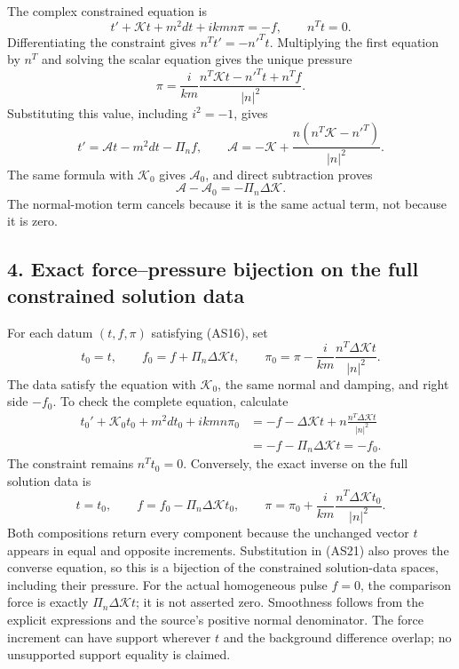 \documentclass[10pt,a4paper]{article}
\begin{document}
The complex constrained equation is \[
t'+\mathcal Kt+m^2dt+ikm n\pi=-f,
\qquad n^Tt=0.
\tag{AS16}
\] Differentiating the constraint gives \(n^Tt'=-n'^Tt\). Multiplying the first equation by \(n^T\) and solving the scalar equation gives the unique pressure \[
\pi=\frac{i}{km}\frac{n^T\mathcal Kt-n'^Tt+n^Tf}{|n|^2}.
\tag{AS17}
\] Substituting this value, including \(i^2=-1\), gives \[
t'=\mathcal A t-m^2dt-\Pi_nf,
\qquad
\mathcal A=-\mathcal K+
\frac{n(n^T\mathcal K-n'^T)}{|n|^2}.
\tag{AS18}
\] The same formula with \(\mathcal K_0\) gives \(\mathcal A_0\), and direct subtraction proves \[
\mathcal A-\mathcal A_0=-\Pi_n\Delta\mathcal K.
\tag{AS19}
\] The normal-motion term cancels because it is the same actual term, not because it is zero.

\subsection{4. Exact force--pressure bijection on the full constrained solution data}\label{gclosure:exact-forcepressure-bijection-on-the-full-constrained-solution-data}

For each datum \((t,f,\pi)\) satisfying (AS16), set \[
t_0=t,\qquad f_0=f+\Pi_n\Delta\mathcal Kt,
\qquad \pi_0=\pi-\frac{i}{km}\frac{n^T\Delta\mathcal Kt}{|n|^2}.
\tag{AS20}
\] The data satisfy the equation with \(\mathcal K_0\), the same normal and damping, and right side \(-f_0\). To check the complete equation, calculate \[
\begin{aligned}
t_0'+\mathcal K_0t_0+m^2dt_0+ikm n\pi_0
&=-f-\Delta\mathcal Kt
+n\frac{n^T\Delta\mathcal Kt}{|n|^2}\\
&=-f-\Pi_n\Delta\mathcal Kt=-f_0.
\end{aligned}
\tag{AS21}
\] The constraint remains \(n^Tt_0=0\). Conversely, the exact inverse on the full solution data is \[
t=t_0,\qquad f=f_0-\Pi_n\Delta\mathcal Kt_0,
\qquad \pi=\pi_0+\frac{i}{km}\frac{n^T\Delta\mathcal Kt_0}{|n|^2}.
\tag{AS22}
\] Both compositions return every component because the unchanged vector \(t\) appears in equal and opposite increments. Substitution in (AS21) also proves the converse equation, so this is a bijection of the constrained solution-data spaces, including their pressure. For the actual homogeneous pulse \(f=0\), the comparison force is exactly \(\Pi_n\Delta\mathcal Kt\); it is not asserted zero. Smoothness follows from the explicit expressions and the source's positive normal denominator. The force increment can have support wherever \(t\) and the background difference overlap; no unsupported support equality is claimed.
\end{document}
